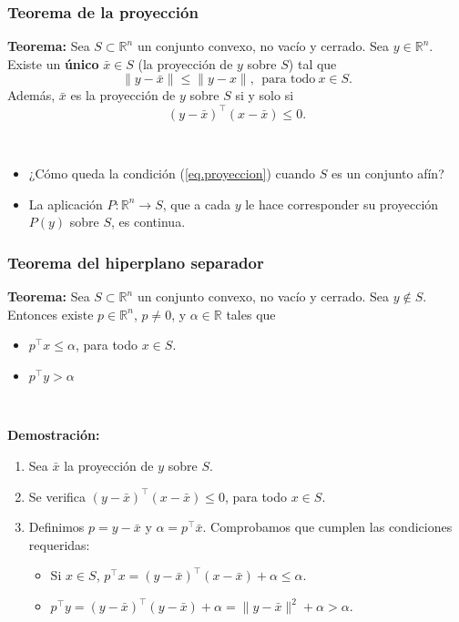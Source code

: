 \documentclass{beamer}
\begin{document}
\begin{frame}
\frametitle{Teorema de la proyección}

{\bf Teorema:} Sea $S\subset\mathbb{R}^n$ un conjunto convexo, no vacío y cerrado. Sea $y\in \mathbb{R}^n$. Existe un \textbf{único} $\bar x\in S$ (la proyección de $y$ sobre $S$) tal que 
\[
\|y-\bar x\| \leq \|y - x\|, \ \ \mbox{para todo}\ x\in S.
\]
Además, $\bar x$ es la proyección de $y$ sobre $S$ si y solo si
\begin{equation}
\label{eq.proyeccion}
(y-\bar x)^\top (x - \bar{x}) \leq 0.
\end{equation}


\

\begin{itemize}
\item ¿Cómo queda la condición (\ref{eq.proyeccion}) cuando $S$ es un conjunto afín?
\item La aplicación $P:\mathbb{R}^n\to S$, que a cada $y$ le hace corresponder su proyección $P(y)$ sobre $S$, es continua.
\end{itemize}

\end{frame}
\begin{frame}
\frametitle{Teorema del hiperplano separador}

{\bf Teorema:} Sea $S\subset\mathbb{R}^n$ un conjunto convexo, no vacío y cerrado. Sea $y\notin S$. Entonces existe $p\in\mathbb{R}^n$, $p\neq 0$, y $\alpha\in\mathbb{R}$ tales que
\begin{itemize}
\item $p^\top x\leq \alpha$, para todo $x\in S$.
\item $p^\top y > \alpha$ 
\end{itemize}

\

\textbf{Demostración:} 

\begin{enumerate}
\item Sea $\bar x$ la proyección de $y$ sobre $S$.

\item Se verifica $(y-\bar{x})^\top (x-\bar{x})\leq 0$,   para todo $x\in S$.

\item Definimos $p=y-\bar{x}$ y $\alpha=p^\top\bar{x}$. Comprobamos que cumplen las condiciones requeridas:
\begin{itemize}
\item Si $x\in S$, $p^\top x = (y-\bar{x})^\top (x-\bar{x}) + \alpha \leq \alpha$.
\item $p^\top y = (y-\bar{x})^\top (y-\bar{x}) + \alpha =\|y-\bar x\|^2 +\alpha > \alpha$.
\end{itemize}

\end{enumerate}



\end{frame}
\end{document}
